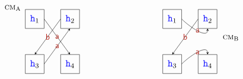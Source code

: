  \begin{equation}
    \raisebox{15mm}{$\cm_\mathrm{A}$}
    \begin{array}{c@{\qquad\qquad\qquad\qquad\qquad}c}
 \begin{tikzpicture}[node distance=1.5cm,scale=1]
        \node (square-h) [draw,minimum width=0.8cm,minimum height=0.8cm] {\large $\hh_1$};
        \node (square-k) [draw,minimum width=0.8cm,minimum height=0.8cm, right of = square-h] {\large $\hh_2$};
        \node (square-v)  [draw,minimum width=0.8cm,minimum height=0.8cm, below of = square-h, yshift=-4mm] {\large $\hh_3$};
        \node (square-w)  [draw,minimum width=0.8cm,minimum height=0.8cm, below of = square-k, yshift=-4mm] {\large $\hh_4$};
        \draw [-stealth] (0.4,0)  -- node {$\msg[a]$}  (1.5,-1.5 ); %
        \draw [-stealth] (0.4,-1.9)  --  node {$\msg[a]$} (1.5,-0.4 ); %
        \draw [stealth-] (0,-1.5)  --  node {$\msg[b]$} (1.1,0); %
 \end{tikzpicture}
&
 \begin{tikzpicture}[node distance=1.5cm,scale=1]
        \node (square-h) [draw,minimum width=0.8cm,minimum height=0.8cm] {\large $\HH_1$};
        \node (square-k) [draw,minimum width=0.8cm,minimum height=0.8cm, right of = square-h] {{\large $\hh_2$}};
        \node (square-v)  [draw,minimum width=0.8cm,minimum height=0.8cm, below of = square-h, yshift=-4mm] {{\large $\hh_3$}};
        \node (square-w)  [draw,minimum width=0.8cm,minimum height=0.8cm, below of = square-k, yshift=-4mm] {{\large $\hh_4$}};
        \draw [-stealth] (0.4,-1.9) to[out=45,in=90] node {$\msg[a]$} (1.5,-1.5 ); %
        \draw [-stealth]  (0.4,0)  to[out=-45,in=-90]  node {$\msg[a]$} (1.5,-0.4 ); %
        \draw [stealth-] (0,-1.5)  --  node {$\msg[b]$} (1.1,0); %
 \end{tikzpicture}
 \raisebox{14.5mm}{$\,\,\,\,\cm_\mathrm{B}$}
 \end{array}
  \end{equation}
 

